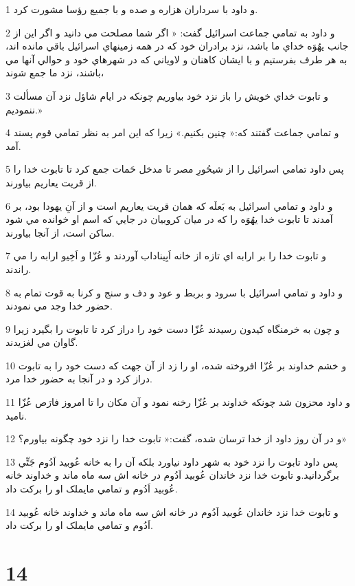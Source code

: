 \par 1 و داود با سرداران هزاره و صده و با جميع رؤسا مشورت کرد.
\par 2 و داود به تمامي جماعت اسرائيل گفت: « اگر شما مصلحت مي دانيد و اگر اين از جانب يهُوَه خداي ما باشد، نزد برادران خود که در همه زمينهاي اسرائيل باقي مانده اند، به هر طرف بفرستيم و با ايشان کاهنان و لاوياني که در شهرهاي خود و حوالي آنها مي باشند، نزد ما جمع شوند،
\par 3 و تابوت خداي خويش را باز نزد خود بياوريم چونکه در ايام شاؤل نزد آن مسألت ننموديم.»
\par 4 و تمامي جماعت گفتند که:« چنين بکنيم.» زيرا که اين امر به نظر تمامي قوم پسند آمد.
\par 5 پس داود تمامي اسرائيل را از شيحُورِ مصر تا مدخل حَمات جمع کرد تا تابوت خدا را از قريت يعاريم بياورند.
\par 6 و داود و تمامي اسرائيل به بَعلَه که همان قريت يعاريم است و از آنِ يهودا بود، بر آمدند تا تابوت خدا يهُوَه را که در ميان کروبيان در جايي که اسم او خوانده مي شود ساکن است، از آنجا بياورند.
\par 7 و تابوت خدا را بر ارابه اي تازه از خانه اَبِيناداب آوردند و عُزّا و اَخِيو ارابه را مي راندند.
\par 8 و داود و تمامي اسرائيل با سرود و بربط و عود و دف و سنج و کرنا به قوت تمام به حضور خدا وجد مي نمودند.
\par 9 و چون به خرمنگاه کيدون رسيدند عُزّا دست خود را دراز کرد تا تابوت را بگيرد زيرا گاوان مي لغزيدند.
\par 10 و خشم خداوند بر عُزّا افروخته شده، او را زد از آن جهت که دست خود را به تابوت دراز کرد و در آنجا به حضور خدا مرد.
\par 11 و داود محزون شد چونکه خداوند بر عُزّا رخنه نمود و آن مکان را تا امروز فارَص عُزّا ناميد.
\par 12 و در آن روز داود از خدا ترسان شده، گفت:« تابوت خدا را نزد خود چگونه بياورم؟»
\par 13 پس داود تابوت را نزد خود به شهر داود نياورد بلکه آن را به خانه عُوبيد اَدُوم جَتِّي برگردانيد.و تابوت خدا نزد خاندان عُوبيد اَدُوم در خانه اش سه ماه ماند و خداوند خانه عُوبيد اَدُوم و تمامي مايملک او را برکت داد.
\par 14 و تابوت خدا نزد خاندان عُوبيد اَدُوم در خانه اش سه ماه ماند و خداوند خانه عُوبيد اَدُوم و تمامي مايملک او را برکت داد.
 
\chapter{14}


